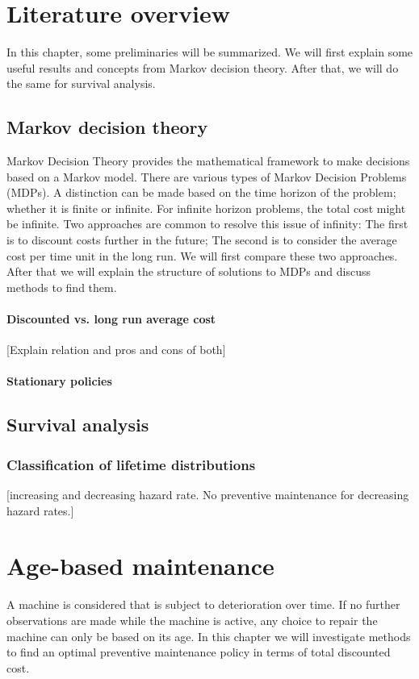 \documentclass[a4paper]{thesis}
\theoremstyle{definition}
\begin{document}
 
\chapter{Literature overview}\label{chapter:literatureOverview}
In this chapter, some preliminaries will be summarized.
We will first explain some useful results and concepts from Markov decision theory.
After that, we will do the same for survival analysis.

\section{Markov decision theory}
Markov Decision Theory provides the mathematical framework to make decisions based on a Markov model.
There are various types of Markov Decision Problems (MDPs).
A distinction can be made based on the time horizon of the problem; whether it is finite or infinite.
For infinite horizon problems, the total cost might be infinite.
Two approaches are common to resolve this issue of infinity: The first is to discount costs further in the future; The second is to consider the average cost per time unit in the long run.
We will first compare these two approaches.
After that we will explain the structure of solutions to MDPs and discuss methods to find them.
\subsubsection{Discounted vs. long run average cost}
[Explain relation and pros and cons of both]
\subsubsection{Stationary policies}
\section{Survival analysis}
\subsection{Classification of lifetime distributions}
[increasing and decreasing hazard rate. No preventive maintenance for decreasing hazard rates.]


\chapter{Age-based maintenance}\label{chapter:AgeBased}
A machine is considered that is subject to deterioration over time.
If no further observations are made while the machine is active, any choice to repair the machine can only be based on its age.
In this chapter we will investigate methods to find an optimal preventive maintenance policy in terms of total discounted cost.
\end{document}
